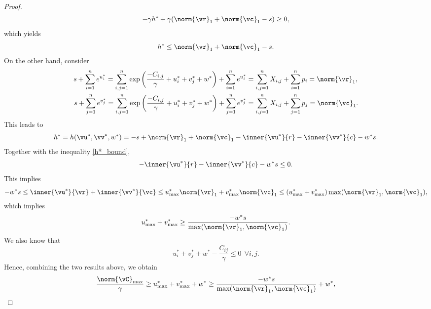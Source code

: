 \begin{proof}
    \begin{equation*} 
         - \gamma h^\ast + \gamma (\norm{\vr}_1 + \norm{\vc}_1 - s) \geq 0,
    \end{equation*}
    which yields
    \begin{equation} \label{h*_bound}
        h^\ast \leq \norm{\vr}_1 + \norm{\vc}_1 - s.
    \end{equation}
    On the other hand, consider 
    \begin{align*}
        s + \sum_{i=1}^{n} e^{u^\ast_i} = \sum_{i,j = 1}^{n} \exp \left(\frac{- C_{i, j}}{\gamma} + u^\ast_i + v^\ast_j + w^\ast \right) + \sum_{i=1}^{n} e^{u^\ast_i} &= \sum_{i,j = 1}^{n} X_{i,j} + \sum_{i=1}^{n} p_i = \norm{\vr}_1, \\
        s + \sum_{j=1}^{n} e^{v^\ast_j} = \sum_{i,j = 1}^{n} \exp \left(\frac{- C_{i, j}}{\gamma} + u^\ast_i + v^\ast_j + w^\ast \right) + \sum_{j=1}^{n} e^{v^\ast_j} &= \sum_{i,j = 1}^{n} X_{i,j} + \sum_{j=1}^{n} p_j = \norm{\vc}_1.
    \end{align*}
    This leads to
    \begin{equation*}
        h^\ast = h(\vu^\ast, \vv^\ast, w^\ast) = -s + \norm{\vr}_1 + \norm{\vc}_1 - \inner{\vu^\ast}{r} - \inner{\vv^\ast}{c} - w^\ast s.
    \end{equation*}
    Together with the inequality \eqref{h*_bound}, 
    \begin{equation*}
        - \inner{\vu^\ast}{r} - \inner{\vv^\ast}{c} - w^\ast s \leq 0.
    \end{equation*}
    This implies
    \begin{equation*}
        - w^\ast s \leq \inner{\vu^\ast}{\vr} + \inner{\vv^\ast}{\vc} \leq u^\ast_{\max} \norm{\vr}_1 + v^\ast_{\max} \norm{\vc}_1 \leq (u^\ast_{\max} + v^\ast_{\max}) \max(\norm{\vr}_1, \norm{\vc}_1),
    \end{equation*}
    which implies 
    \begin{equation*}
        u^\ast_{\max} + v^\ast_{\max} \geq \frac{- w^\ast s}{\max(\norm{\vr}_1, \norm{\vc}_1)}.
    \end{equation*}
    We also know that 
    \begin{equation*}
        u^\ast_i + v^\ast_j + w^\ast - \frac{C_{ij}}{\gamma} \leq 0 \: \: \forall i,j.
    \end{equation*}
    Hence, combining the two results above, we obtain
    \begin{equation*}
        \frac{\norm{\vC}_{\max}}{\gamma} \geq  u^\ast_{\max} + v^\ast_{\max} + w^\ast \geq \frac{- w^\ast s}{\max(\norm{\vr}_1, \norm{\vc}_1)} + w^\ast,

\end{equation*}
\end{proof}
